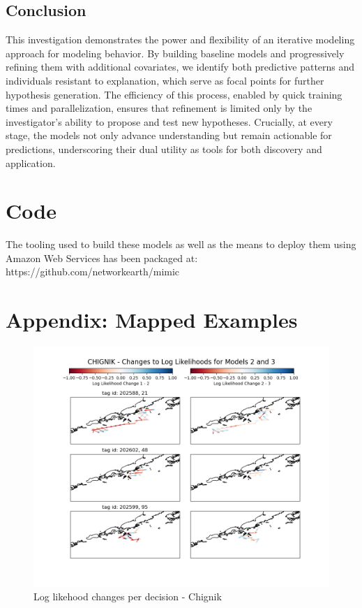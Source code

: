 \documentclass[11pt]{article}
\begin{document}
\subsection*{Conclusion}

This investigation demonstrates the power and flexibility of an iterative modeling approach for modeling behavior. By building baseline models and progressively refining them with additional covariates, we identify both predictive patterns and individuals resistant to explanation, which serve as focal points for further hypothesis generation. The efficiency of this process, enabled by quick training times and parallelization, ensures that refinement is limited only by the investigator's ability to propose and test new hypotheses. Crucially, at every stage, the models not only advance understanding but remain actionable for predictions, underscoring their dual utility as tools for both discovery and application. 

\newpage

\section*{Code}

The tooling used to build these models as well as the means to deploy them using Amazon Web Services has been packaged at: \newline https://github.com/networkearth/mimic



\newpage
\section*{Appendix: Mapped Examples}

\begin{figure}[h!] 
	\centering
  \includegraphics[width=140mm]{figures/chignik_map.png}
  \caption{Log likehood changes per decision - Chignik}
  \label{fig:chignik_map}
\end{figure}
\end{document}
